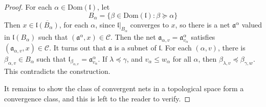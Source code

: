 \begin{proof}
    For each $\alpha \in \text{Dom}(\mathfrak{l})$, let
    \[ B_\alpha = \{ \beta \in \text{Dom}(\mathfrak{l}) : \beta \succeq \alpha \} \]
    Then $x \in \overline{\mathfrak{l}(B_\alpha)}$, for each $\alpha$, since $\mathfrak{l}|_{B_\alpha}$ converges to $x$, so there is a net $\mathfrak{a}^\alpha$ valued in $\mathfrak{l}(B_\alpha)$ such that $(\mathfrak{a}^\alpha, x) \in \mathcal{C}$. Then the net $\mathfrak{a}_{\alpha, v} = \mathfrak{a}^\alpha_{v_\alpha}$ satisfies $(\mathfrak{a}_{\alpha, v}, x) \in \mathcal{C}$. It turns out that $\mathfrak{a}$ is a subnet of $\mathfrak{l}$. For each $(\alpha, v)$, there is $\beta_{\alpha,v} \in B_\alpha$ such that $\mathfrak{l}_{\beta_{\alpha,v}} = \mathfrak{a}^\alpha_{v_\alpha}$. If $\lambda \preceq \gamma$, and $v_\alpha \leq w_\alpha$ for all $\alpha$, then $\beta_{\lambda,v} \preceq \beta_{\gamma,w}$. This contradicts the construction.

    It remains to show the class of convergent nets in a topological space form a convergence class, and this is left to the reader to verify.
\end{proof}

